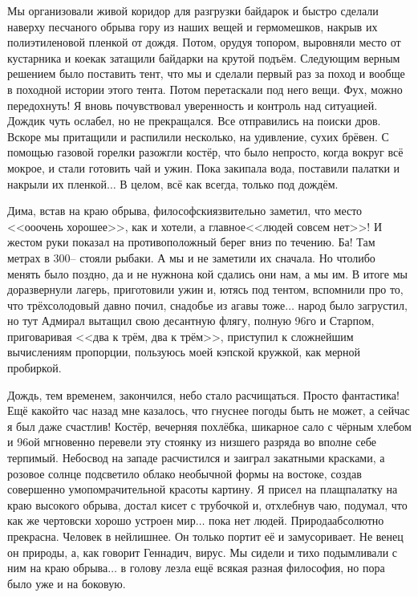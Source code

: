 Мы организовали живой коридор для разгрузки байдарок и быстро сделали наверху песчаного обрыва гору из наших вещей и гермомешков, накрыв их полиэтиленовой пленкой от дождя. Потом, орудуя топором, выровняли место от кустарника и кое\sdash как затащили байдарки на крутой подъём. Следующим верным решением было поставить тент, что мы и сделали первый раз за поход и вообще в походной истории этого тента. Потом перетаскали под него вещи. Фух, можно передохнуть! Я вновь почувствовал уверенность и контроль над ситуацией. Дождик чуть ослабел, но не прекращался. Все отправились на поиски дров. Вскоре мы притащили и распилили несколько, на удивление, сухих брёвен. С помощью газовой горелки разожгли костёр, что было непросто, когда вокруг всё мокрое, и стали готовить чай и ужин. Пока закипала вода, поставили палатки и накрыли их пленкой$\ldots$ В целом, всё как всегда, только под дождём. 

Дима, встав на краю обрыва, философски\sdash язвительно заметил, что место <<о\sdash о\sdash очень хорошее>>, как и хотели, а главное\mdash <<людей совсем нет>>! И жестом руки показал на противоположный берег вниз по течению. Ба! Там метрах в 300\thinspace\nobreakdash-- стояли рыбаки. А мы и не заметили их сначала. Но что\sdash либо менять было поздно, да и не нужно\mdash на кой сдались они нам, а мы им. В итоге мы доразвернули лагерь, приготовили ужин и, ютясь под тентом, вспомнили про то, что трёхсолодовый давно почил, снадобье из агавы тоже$\ldots$ народ было загрустил, но тут Адмирал вытащил свою десантную флягу, полную 96\sdash го и Старпом, приговаривая <<два к трём, два к трём>>, приступил к сложнейшим вычислениям пропорции, пользуюсь моей кэпской кружкой, как мерной пробиркой. 

Дождь, тем временем, закончился, небо стало расчищаться. Просто фантастика! Ещё какой\sdash то час назад мне казалось, что гнуснее погоды быть не может, а сейчас я был даже счастлив! Костёр, вечерняя похлёбка, шикарное сало с чёрным хлебом и 96\sdash ой мгновенно перевели эту стоянку из низшего разряда во вполне себе терпимый. Небосвод на западе расчистился и заиграл закатными красками, а розовое солнце подсветило облако необычной формы на востоке, создав совершенно умопомрачительной красоты картину. Я присел на плащ\sdash палатку на краю высокого обрыва, достал кисет с трубочкой и, отхлебнув чаю, подумал, что как же чертовски хорошо устроен мир$\ldots$ пока нет людей. Природа\mdash абсолютно прекрасна. Человек в ней\mdash лишнее. Он только портит её и замусоривает. Не венец он природы, а, как говорит Геннадич, вирус. Мы сидели и тихо подымливали с ним на краю обрыва$\ldots$ в голову лезла ещё всякая разная философия, но пора было уже и на боковую. 

